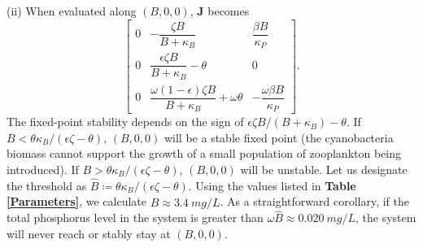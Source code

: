 \documentclass{article}
\renewcommand\vec{\mathbf}
\begin{document}
(ii) When evaluated along $(B, 0, 0)$, $\vec{J}$ becomes
\begin{equation*}
    \begin{bmatrix}
    0 & - \dfrac{\zeta B}{B + \kappa_B} & \dfrac{\beta B}{\kappa_P} \\[1.5em]
    0 & \dfrac{\epsilon \zeta B}{B + \kappa_B} - \theta & 0 \\[1.5em]
    0 & \dfrac{\omega (1 - \epsilon) \zeta B}{B + \kappa_B} + \omega \theta & -\dfrac{\omega \beta B}{\kappa_P}
    \end{bmatrix}.
\end{equation*}
The fixed-point stability depends on the sign of $\epsilon \zeta B/(B + \kappa_B) - \theta$. If $B < \theta \kappa_B/(\epsilon \zeta - \theta)$, $(B, 0, 0)$ will be a stable fixed point (the cyanobacteria biomass cannot support the growth of a small population of zooplankton being introduced). If $B > \theta \kappa_B/(\epsilon \zeta - \theta)$, $(B, 0, 0)$ will be unstable. Let us designate the threshold as $\hat{B} \coloneqq \theta \kappa_B/(\epsilon \zeta - \theta)$. Using the values listed in \textbf{Table \ref{Parameters}}, we calculate $\hat{B} \approx \SI{3.4}{mg/L}$. As a straightforward corollary, if the total phosphorus level in the system is greater than $\omega\hat{B} \approx \SI{0.020}{mg/L}$, the system will never reach or stably stay at $(B, 0, 0)$.
\end{document}
